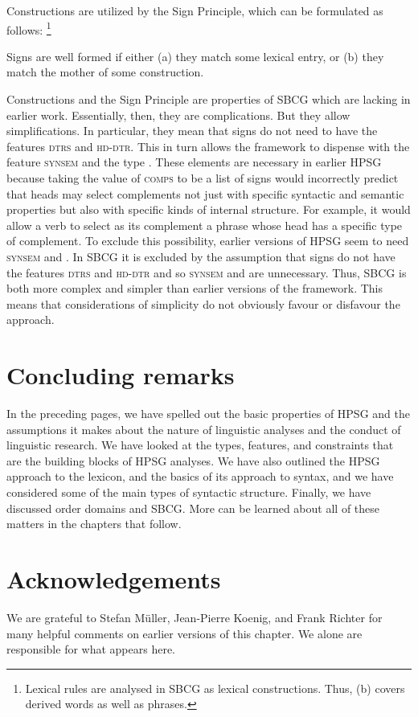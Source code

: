 \documentclass[output=paper
	        ,collection
	        ,collectionchapter
 	        ,biblatex
                ,babelshorthands
                ,newtxmath
                ,draftmode
                ,colorlinks, citecolor=brown
]{langscibook}
\begin{document}
\noindent
Constructions are utilized by the Sign Principle, which can be formulated as follows:%
%
\footnote{Lexical rules are analysed in SBCG as lexical constructions. Thus, (b) covers derived words as well as phrases.}
%

\ea\label{ex:prop49}
Signs are well formed if either (a) they match some lexical entry, or (b) they match the mother of some construction.
\z

\noindent
Constructions and the Sign Principle are properties of SBCG which are lacking in earlier
work. Essentially, then, they are complications. But they allow simplifications. In particular, they
mean that signs do not need to have the features \textsc{dtrs} and \textsc{hd-dtr}. This in turn
allows the framework to dispense with the feature \textsc{synsem} and the type . These
elements are necessary in earlier HPSG because taking the value of \textsc{comps} to be a list of
signs would incorrectly predict that heads may select complements not just with specific syntactic
and semantic properties but also with specific kinds of internal structure. For example, it would
allow a verb to select as its complement a phrase whose head has a specific type of complement. To
exclude this possibility, earlier versions of HPSG seem to need \textsc{synsem} and 
\citep[]{ps2}. In SBCG it is excluded by the assumption that signs do not have the features
\textsc{dtrs} and \textsc{hd-dtr} and so \textsc{synsem} and  are unnecessary. Thus,
SBCG is both more complex and simpler than earlier versions of the framework. This means that
considerations of simplicity do not obviously favour or disfavour the approach. 

\section{Concluding remarks}\label{sec:prop8}

In the preceding pages, we have spelled out the basic properties of HPSG and the assumptions it makes about the nature of linguistic analyses and the conduct of linguistic research. We have looked at the types, features, and constraints that are the building blocks of HPSG analyses. We have also outlined the HPSG approach to the lexicon, and the basics of its approach to syntax, and we have considered some of the main types of syntactic structure. Finally, we have discussed order domains and SBCG. More can be learned about all of these matters in the chapters that follow.


\section*{Acknowledgements}

We are grateful to Stefan Müller, Jean-Pierre Koenig, and Frank Richter for many helpful comments on
earlier versions of this chapter. We alone are responsible for what appears here.



{\sloppy
\printbibliography[heading=subbibliography,notkeyword=this]
}
\end{document}
